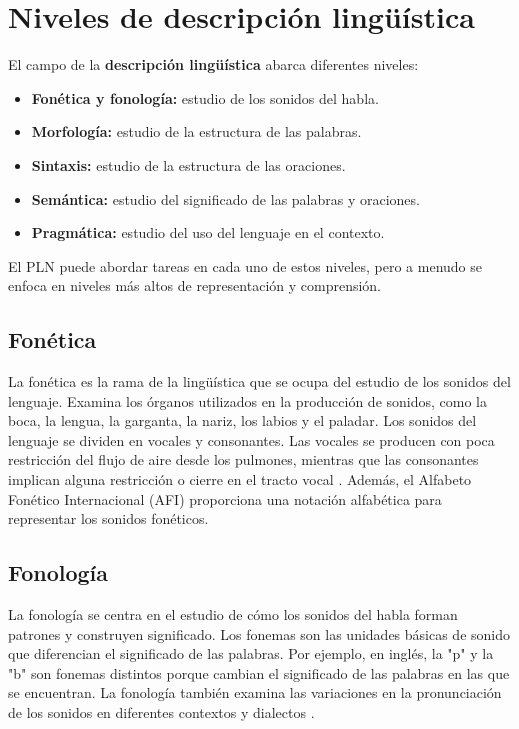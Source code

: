 \documentclass{book}
\begin{document}
\section{Niveles de descripción lingüística}

El campo de la \textbf{descripción lingüística} abarca diferentes niveles:

\begin{itemize}
  \item \textbf{Fonética y fonología:} estudio de los sonidos del habla.
  \item \textbf{Morfología:} estudio de la estructura de las palabras.
  \item \textbf{Sintaxis:} estudio de la estructura de las oraciones.
  \item \textbf{Semántica:} estudio del significado de las palabras y oraciones.
  \item \textbf{Pragmática:} estudio del uso del lenguaje en el contexto.
\end{itemize}

El PLN puede abordar tareas en cada uno de estos niveles, pero a menudo se enfoca en niveles más altos de representación y comprensión.




\subsection{Fonética}

La fonética es la rama de la lingüística que se ocupa del estudio de los sonidos del lenguaje. Examina los órganos utilizados en la producción de sonidos, como la boca, la lengua, la garganta, la nariz, los labios y el paladar. Los sonidos del lenguaje se dividen en vocales y consonantes. Las vocales se producen con poca restricción del flujo de aire desde los pulmones, mientras que las consonantes implican alguna restricción o cierre en el tracto vocal \cite{JohnsonMLSS, fromkin2018introduction}. Además, el Alfabeto Fonético Internacional (AFI) proporciona una notación alfabética para representar los sonidos fonéticos.

\subsection{Fonología}

La fonología se centra en el estudio de cómo los sonidos del habla forman patrones y construyen significado. Los fonemas son las unidades básicas de sonido que diferencian el significado de las palabras. Por ejemplo, en inglés, la "p" y la "b" son fonemas distintos porque cambian el significado de las palabras en las que se encuentran. La fonología también examina las variaciones en la pronunciación de los sonidos en diferentes contextos y dialectos \cite{fromkin2018introduction}.
\end{document}
